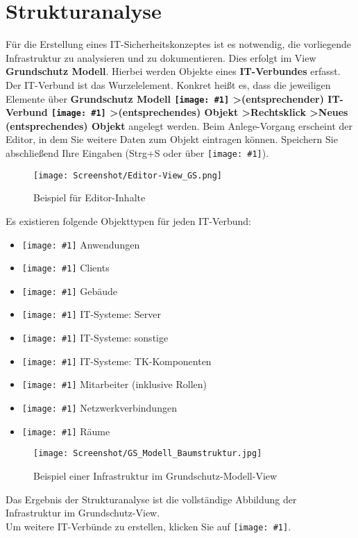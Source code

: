 \documentclass[a4paper,10pt]{book}
\newcommand{\icon}[1]{\texttt{[image: \#1]}}
\begin{document}
\section{Strukturanalyse} \label{Strukturanalyse}
Für die Erstellung eines IT-Sicherheitskonzeptes ist es notwendig, die vorliegende Infrastruktur zu analysieren und zu dokumentieren. Dies erfolgt im View \textbf{Grundschutz Modell}. Hierbei werden Objekte eines \textbf{IT-Verbundes} erfasst. Der IT-Verbund ist das Wurzelelement. Konkret heißt es, dass die jeweiligen Elemente über \textbf{Grundschutz Modell \icon{Icon/GS_Modell.png} \textgreater (entsprechender) IT-Verbund \icon{Icon/GS_Modell.png} \textgreater (entsprechendes) Objekt \textgreater Rechtsklick \textgreater Neues (entsprechendes) Objekt} angelegt werden. Beim Anlege-Vorgang erscheint der Editor, in dem Sie weitere Daten zum Objekt eintragen können. Speichern Sie abschließend Ihre Eingaben (Strg+S oder über \icon{Icon/Disk.png}).
\newline
\begin{figure}[htb!]
  \centering
  \texttt{[image: Screenshot/Editor-View\_GS.png]}
  \caption{\label{Beispiel fuer Editor-Inhalte} Beispiel für Editor-Inhalte}
\end{figure}
\newline
Es existieren folgende Objekttypen für jeden IT-Verbund:
\begin{itemize}
 \item \icon{Icon/Anwendung.png} Anwendungen
 \item \icon{Icon/Clients.png} Clients
 \item \icon{Icon/Gebaeude.png} Gebäude
 \item \icon{Icon/Server.png} IT-Systeme: Server
 \item \icon{Icon/Sonstige.png} IT-Systeme: sonstige
 \item \icon{Icon/Tk_komponenten.png} IT-Systeme: TK-Komponenten
 \item \icon{Icon/Mitarbeiter.png} Mitarbeiter (inklusive Rollen)
 \item \icon{Icon/Netzwerkverbindungen.png} Netzwerkverbindungen
 \item \icon{Icon/Raeume.png} Räume
\end{itemize}
\begin{figure}[htb!]
  \centering
  \texttt{[image: Screenshot/GS\_Modell\_Baumstruktur.jpg]}
  \caption{\label{fig:beispiel-einer-infrastruktur-im-grundschutz-modell-view}
    Beispiel einer Infrastruktur im Grundschutz-Modell-View}
\end{figure}
Das Ergebnis der Strukturanalyse ist die vollständige Abbildung der Infrastruktur im Grundschutz-View.
\newline\\
Um weitere IT-Verbünde zu erstellen, klicken Sie auf \icon{Icon/Oeffnen.png}.
\end{document}
